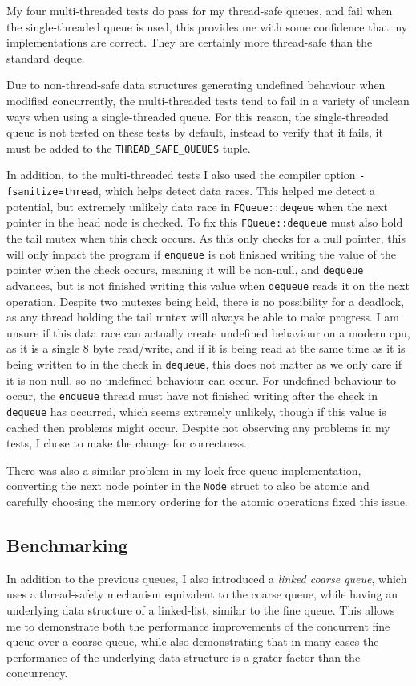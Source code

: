 \documentclass{article}
\begin{document}
My four multi-threaded tests do pass for my thread-safe queues, and fail when
the single-threaded queue is used, this provides me with some confidence that my
implementations are correct. They are certainly more thread-safe than the
standard deque.

Due to non-thread-safe data structures generating undefined behaviour when
modified concurrently, the multi-threaded tests tend to fail in a variety of
unclean ways when using a single-threaded queue. For this reason, the
single-threaded queue is not tested on these tests by default, instead to verify
that it fails, it must be added to the \verb|THREAD_SAFE_QUEUES| tuple.

In addition, to the multi-threaded tests I also used the compiler option
\verb|-fsanitize=thread|, which helps detect data races. This helped me detect a
potential, but extremely unlikely data race in \verb|FQueue::deqeue| when the
next pointer in the head node is checked. To fix this \verb|FQueue::dequeue|
must also hold the tail mutex when this check occurs. As this only checks for a
null pointer, this will only impact the program if \verb|enqueue| is not
finished writing the value of the pointer when the check occurs, meaning it will
be non-null, and \verb|dequeue| advances, but is not finished writing this value
when \verb|dequeue| reads it on the next operation. Despite two mutexes being
held, there is no possibility for a deadlock, as any thread holding the tail
mutex will always be able to make progress. I am unsure if this data race can
actually create undefined behaviour on a modern cpu, as it is a single 8 byte
read/write, and if it is being read at the same time as it is being written
to in the check in \verb|dequeue|, this does not matter as we only care if it
is non-null, so no undefined behaviour can occur. For undefined behaviour to
occur, the \verb|enqueue| thread must have not finished writing after the check
in \verb|dequeue| has occurred, which seems extremely unlikely, though if this
value is cached then problems might occur. Despite not observing any problems in
my tests, I chose to make the change for correctness. 

There was also a similar problem in my lock-free queue implementation,
converting the next node pointer in the \verb|Node| struct to also be atomic
and carefully choosing the memory ordering for the atomic operations fixed this
issue.

\subsection{Benchmarking}
In addition to the previous queues, I also introduced a \textit{linked coarse
queue}, which uses a thread-safety mechanism equivalent to the coarse queue,
while having an underlying data structure of a linked-list, similar to the fine
queue. This allows me to demonstrate both the performance improvements of the
concurrent fine queue over a coarse queue, while also demonstrating that in many
cases the performance of the underlying data structure is a grater factor than
the concurrency.
\end{document}

